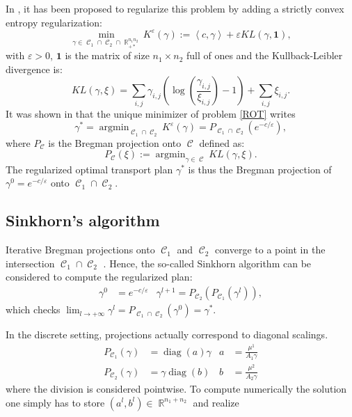 \documentclass{article} %
\newcommand{\scal}[2]{\left\langle #1 , #2 \right\rangle}
\DeclareMathOperator{\IR}{\mathbb{R}}
\DeclareMathOperator*{\argmin}{argmin}
\DeclareMathOperator{\Ccal}{\mathcal{C}}
\DeclareMathOperator{\diag}{diag}
\renewcommand{\epsilon}{\varepsilon}
\theoremstyle{plain}
\theoremstyle{definition}
\theoremstyle{remark}
\begin{document}
In \cite{cuturi13}, it has been proposed to regularize this problem by adding a strictly convex entropy regularization:
\begin{equation}\label{ROT}
\min_{\gamma\in\Ccal_1\cap \Ccal_2\cap \IR^{n_1 n_2}_{+*}}K^\epsilon(\gamma) := \scal{c}{\gamma} 
+ \epsilon KL(\gamma,\mathbf{1})
,\end{equation}
with $\epsilon>0$, $\mathbf{1}$ is the matrix of size $n_1\times n_2$ full of ones and the Kullback-Leibler divergence is:
\begin{equation}\label{KL}
KL(\gamma,\xi) = \sum_{i,j} \gamma_{i,j} \left( \log \left( \frac{\gamma_{i,j}}{\xi_{i,j}} \right) -1  \right) + \sum_{i,j} \xi_{i,j}.
\end{equation}
It was shown in \cite{benamou15}  that the unique minimizer of problem \eqref{ROT} writes
\begin{equation}\label{eq:reg_ot_pb}
\gamma^* = \argmin_{\Ccal_1 \cap \Ccal_2} K^\epsilon(\gamma)= P_{\Ccal_1 \cap \Ccal_2} (e^{-c/\epsilon}),
\end{equation}
where $P_{\Ccal}$ is the  Bregman projection onto $\Ccal$ defined as:
\[
P_{\Ccal}(\xi) := \argmin_{\gamma \in \Ccal} KL(\gamma,\xi).
\]
The regularized  optimal transport plan $\gamma^*$ is thus the Bregman projection of $\gamma^0 = e^{-c/\epsilon}$ onto $\Ccal_1 \cap \Ccal_2$.


\subsection{Sinkhorn's algorithm}
Iterative Bregman projections onto $\Ccal_1$ and $\Ccal_2$ converge to a point in the intersection $\Ccal_1 \cap \Ccal_2$ \cite{bregman67}. Hence, the so-called Sinkhorn algorithm \cite{sinkhorn64} can be considered to compute the regularized  plan:
\begin{align*}
\gamma^0 &= e^{-c/\epsilon} &
\gamma^{l+1} = P_{\Ccal_2}(P_{\Ccal_1}(\gamma^l)),
\end{align*}
which checks 
$\lim_{l\rightarrow +\infty} \gamma^l = P_{\Ccal_1 \cap \Ccal_2}(\gamma^0) = \gamma^*.$

In the discrete setting,  projections actually correspond to diagonal scalings.
\begin{align}\label{scaling}
P_{\Ccal_1}(\gamma) &= \diag(a) \gamma &
a &=  \frac{\mu^1}{A_1 \gamma} \\
P_{\Ccal_2}(\gamma) &= \gamma \diag(b) &
b &= \frac{\mu^2}{A_2 \gamma}\nonumber
\end{align}
where the division is considered pointwise. 
To compute numerically the solution  one simply has to store $(a^l, b^l)\in\IR^{n_1+n_2}$ and realize
\end{document}
